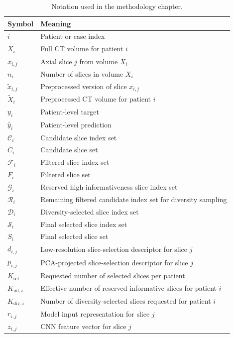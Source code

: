\begin{table}[H]
\centering
\caption{Notation used in the methodology chapter.}
\label{tab:methodology_notation}
\begin{tabular}{ll}
\toprule
Symbol & Meaning \\
\midrule
\(i\) & Patient or case index \\
\(X_i\) & Full CT volume for patient \(i\) \\
\(x_{i,j}\) & Axial slice \(j\) from volume \(X_i\) \\
\(n_i\) & Number of slices in volume \(X_i\) \\
\(\tilde{x}_{i,j}\) & Preprocessed version of slice \(x_{i,j}\) \\
\(\tilde{X}_i\) & Preprocessed CT volume for patient \(i\) \\
\(y_i\) & Patient-level target \\
\(\hat{y}_i\) & Patient-level prediction \\
\(\mathcal{C}_i\) & Candidate slice index set \\
\(C_i\) & Candidate slice set \\
\(\mathcal{F}_i\) & Filtered slice index set \\
\(F_i\) & Filtered slice set \\
\(\mathcal{G}_i\) & Reserved high-informativeness slice index set \\
\(\mathcal{R}_i\) & Remaining filtered candidate index set for diversity sampling \\
\(\mathcal{D}_i\) & Diversity-selected slice index set \\
\(\mathcal{S}_i\) & Final selected slice index set \\
\(S_i\) & Final selected slice set \\
\(d_{i,j}\) & Low-resolution slice-selection descriptor for slice \(j\) \\
\(p_{i,j}\) & PCA-projected slice-selection descriptor for slice \(j\) \\
\(K_{\mathrm{sel}}\) & Requested number of selected slices per patient \\
\(K_{\mathrm{inf},i}\) & Effective number of reserved informative slices for patient \(i\) \\
\(K_{\mathrm{div},i}\) & Number of diversity-selected slices requested for patient \(i\) \\
\(r_{i,j}\) & Model input representation for slice \(j\) \\
\(z_{i,j}\) & CNN feature vector for slice \(j\) \\

\end{tabular}
\end{table}
